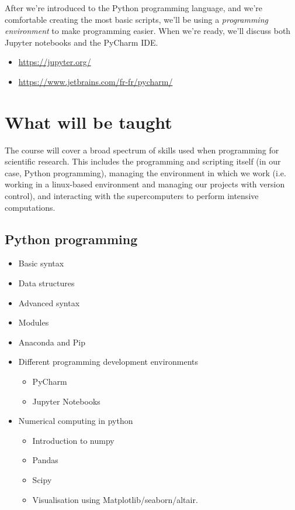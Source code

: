\documentclass[11pt]{article}
\begin{document}
After we're introduced to the Python programming language, and we're comfortable
creating the most basic scripts, we'll be using a \emph{programming environment} to make
programming easier. When we're ready, we'll discuss both Jupyter notebooks and
the PyCharm IDE.

\begin{itemize}
\item \url{https://jupyter.org/}
\item \url{https://www.jetbrains.com/fr-fr/pycharm/}
\end{itemize}

\section{What will be taught}
\label{sec:org59c8981}

The course will cover a broad spectrum of skills used when programming for scientific
research. This includes the programming and scripting itself (in our case, Python
programming), managing the environment in which we work (i.e. working in a
linux-based environment and managing our projects with version control), and
interacting with the supercomputers to perform intensive computations.

\subsection{Python programming}
\label{sec:orgc6d83a9}
\begin{itemize}
\item Basic syntax
\item Data structures
\item Advanced syntax
\item Modules
\item Anaconda and Pip
\item Different programming development environments
\begin{itemize}
\item PyCharm
\item Jupyter Notebooks
\end{itemize}
\item Numerical computing in python
\begin{itemize}
\item Introduction to numpy
\item Pandas
\item Scipy
\item Visualisation using Matplotlib/seaborn/altair.
\end{itemize}
\end{itemize}
\end{document}
